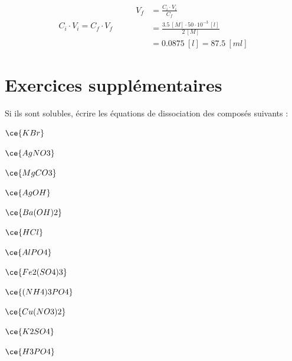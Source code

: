 \documentclass[
  11pt,
  a4paper,
  openany]{book}
\begin{document}
\begin{Answer}
\[
\begin{split}
  C_i \cdot V_i = C_f \cdot V_f
\end{split}
\qquad
\begin{split}
  V_f &= \frac{C_i \cdot V_i}{C_f} \\
  &= \frac{3.5\ [M] \cdot 50 \cdot 10^{-3}\ [l] }{2\ [M]} \\
  &= 0.0875\ [l] = 87.5\ [ml]
\end{split}
\]

\end{Answer}

\hypertarget{exercices-suppluxe9mentaires-7}{%
\section{Exercices supplémentaires}\label{exercices-suppluxe9mentaires-7}}

\begin{Exercise}

Si ils sont solubles, écrire les équations de dissociation des composés suivants :

\begin{multicols}{2}
\(\ce{KBr}\)

\(\ce{AgNO3}\)

\(\ce{MgCO3}\)

\(\ce{AgOH}\)

\(\ce{Ba(OH)2}\)

\(\ce{HCl}\)

\(\ce{AlPO4}\)

\(\ce{Fe2(SO4)3}\)

\(\ce{(NH4)3PO4}\)

\(\ce{Cu(NO3)2}\)

\(\ce{K2SO4}\)

\(\ce{H3PO4}\)

\end{multicols}

\end{Exercise}
\end{document}

